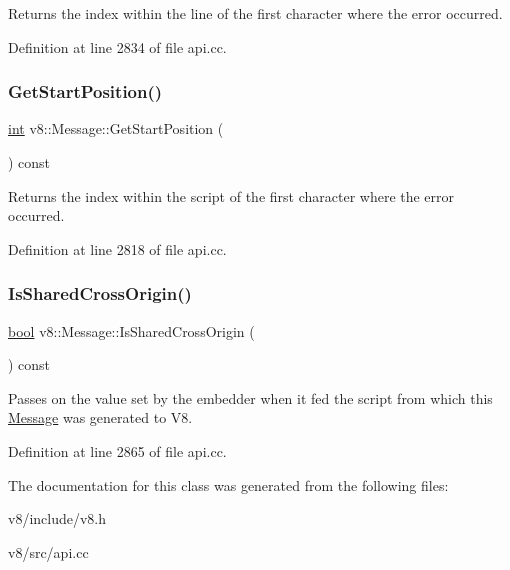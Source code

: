 Returns the index within the line of the first character where the error occurred. 

Definition at line 2834 of file api.\+cc.

\mbox{\label{classv8_1_1Message_a8c32ad25c164ecec1bae0293449589f4}} 
\subsubsection{\texorpdfstring{Get\+Start\+Position()}{GetStartPosition()}}
{\footnotesize\ttfamily \mbox{\hyperlink{classint}{int}} v8\+::\+Message\+::\+Get\+Start\+Position (\begin{DoxyParamCaption}{ }\end{DoxyParamCaption}) const}

Returns the index within the script of the first character where the error occurred. 

Definition at line 2818 of file api.\+cc.

\mbox{\label{classv8_1_1Message_a60e48ec814c324c443043dfaf366590a}} 
\subsubsection{\texorpdfstring{Is\+Shared\+Cross\+Origin()}{IsSharedCrossOrigin()}}
{\footnotesize\ttfamily \mbox{\hyperlink{classbool}{bool}} v8\+::\+Message\+::\+Is\+Shared\+Cross\+Origin (\begin{DoxyParamCaption}{ }\end{DoxyParamCaption}) const}

Passes on the value set by the embedder when it fed the script from which this \mbox{\hyperlink{classv8_1_1Message}{Message}} was generated to V8. 

Definition at line 2865 of file api.\+cc.



The documentation for this class was generated from the following files\+:\begin{DoxyCompactItemize}
\item 
v8/include/v8.\+h\item 
v8/src/api.\+cc\end{DoxyCompactItemize}
